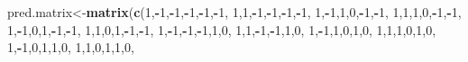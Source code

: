 \documentclass[]{elsarticle} %
\newenvironment{Shaded}{\begin{snugshade}}{\end{snugshade}}
\newcommand{\DecValTok}[1]{\textcolor[rgb]{0.00,0.00,0.81}{#1}}
\newcommand{\KeywordTok}[1]{\textcolor[rgb]{0.13,0.29,0.53}{\textbf{#1}}}
\newcommand{\NormalTok}[1]{#1}
\newcommand{\OperatorTok}[1]{\textcolor[rgb]{0.81,0.36,0.00}{\textbf{#1}}}
\begin{document}
\begin{Shaded}
\begin{Highlighting}[numbers=left,,]
{{\NormalTok{pred.matrix<-}\KeywordTok{matrix}\NormalTok{(}\KeywordTok{c}\NormalTok{(}\DecValTok{1}\NormalTok{,}\OperatorTok{-}\DecValTok{1}\NormalTok{,}\OperatorTok{-}\DecValTok{1}\NormalTok{,}\OperatorTok{-}\DecValTok{1}\NormalTok{,}\OperatorTok{-}\DecValTok{1}\NormalTok{,}\OperatorTok{-}\DecValTok{1}\NormalTok{,}
                      \DecValTok{1}\NormalTok{,}\DecValTok{1}\NormalTok{,}\OperatorTok{-}\DecValTok{1}\NormalTok{,}\OperatorTok{-}\DecValTok{1}\NormalTok{,}\OperatorTok{-}\DecValTok{1}\NormalTok{,}\OperatorTok{-}\DecValTok{1}\NormalTok{,}
                      \DecValTok{1}\NormalTok{,}\OperatorTok{-}\DecValTok{1}\NormalTok{,}\DecValTok{1}\NormalTok{,}\DecValTok{0}\NormalTok{,}\OperatorTok{-}\DecValTok{1}\NormalTok{,}\OperatorTok{-}\DecValTok{1}\NormalTok{,}
                      \DecValTok{1}\NormalTok{,}\DecValTok{1}\NormalTok{,}\DecValTok{1}\NormalTok{,}\DecValTok{0}\NormalTok{,}\OperatorTok{-}\DecValTok{1}\NormalTok{,}\OperatorTok{-}\DecValTok{1}\NormalTok{,}
                      \DecValTok{1}\NormalTok{,}\OperatorTok{-}\DecValTok{1}\NormalTok{,}\DecValTok{0}\NormalTok{,}\DecValTok{1}\NormalTok{,}\OperatorTok{-}\DecValTok{1}\NormalTok{,}\OperatorTok{-}\DecValTok{1}\NormalTok{,}
                      \DecValTok{1}\NormalTok{,}\DecValTok{1}\NormalTok{,}\DecValTok{0}\NormalTok{,}\DecValTok{1}\NormalTok{,}\OperatorTok{-}\DecValTok{1}\NormalTok{,}\OperatorTok{-}\DecValTok{1}\NormalTok{,}
                      \DecValTok{1}\NormalTok{,}\OperatorTok{-}\DecValTok{1}\NormalTok{,}\OperatorTok{-}\DecValTok{1}\NormalTok{,}\OperatorTok{-}\DecValTok{1}\NormalTok{,}\DecValTok{1}\NormalTok{,}\DecValTok{0}\NormalTok{,}
                      \DecValTok{1}\NormalTok{,}\DecValTok{1}\NormalTok{,}\OperatorTok{-}\DecValTok{1}\NormalTok{,}\OperatorTok{-}\DecValTok{1}\NormalTok{,}\DecValTok{1}\NormalTok{,}\DecValTok{0}\NormalTok{,}
                      \DecValTok{1}\NormalTok{,}\OperatorTok{-}\DecValTok{1}\NormalTok{,}\DecValTok{1}\NormalTok{,}\DecValTok{0}\NormalTok{,}\DecValTok{1}\NormalTok{,}\DecValTok{0}\NormalTok{,}
                      \DecValTok{1}\NormalTok{,}\DecValTok{1}\NormalTok{,}\DecValTok{1}\NormalTok{,}\DecValTok{0}\NormalTok{,}\DecValTok{1}\NormalTok{,}\DecValTok{0}\NormalTok{,}
                      \DecValTok{1}\NormalTok{,}\OperatorTok{-}\DecValTok{1}\NormalTok{,}\DecValTok{0}\NormalTok{,}\DecValTok{1}\NormalTok{,}\DecValTok{1}\NormalTok{,}\DecValTok{0}\NormalTok{,}
                      \DecValTok{1}\NormalTok{,}\DecValTok{1}\NormalTok{,}\DecValTok{0}\NormalTok{,}\DecValTok{1}\NormalTok{,}\DecValTok{1}\NormalTok{,}\DecValTok{0}\NormalTok{,}
}}
\end{Highlighting}
\end{Shaded}
\end{document}
